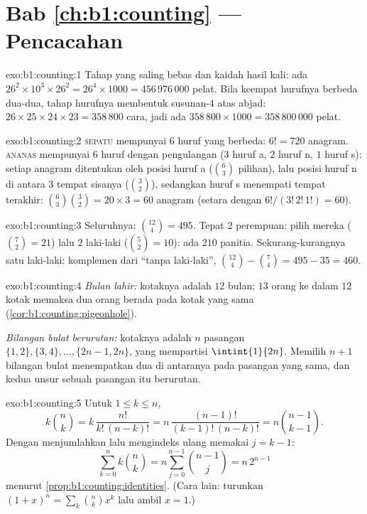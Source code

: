 \section*{Bab \ref{ch:b1:counting} --- Pencacahan}

\begin{solution}{exo:b1:counting:1}
Tahap yang saling bebas dan kaidah hasil kali: ada $26^2 \times 10^3 \times 26^2
= 26^4 \times 1000 = 456\,976\,000$ pelat. Bila keempat hurufnya
berbeda dua-dua, tahap hurufnya membentuk susunan-$4$ atas
abjad: $26 \times 25 \times 24 \times 23 = 358\,800$ cara, jadi ada
$358\,800 \times 1000 = 358\,800\,000$ pelat.
\end{solution}

\begin{solution}{exo:b1:counting:2}
\textsc{sepatu} mempunyai $6$ huruf yang berbeda: $6! = 720$ anagram.
\textsc{ananas} mempunyai $6$ huruf dengan pengulangan ($3$ huruf a, $2$ huruf n,
$1$ huruf s): setiap anagram ditentukan oleh posisi huruf a
($\binom 63$ pilihan), lalu posisi huruf n di antara $3$ tempat sisanya
($\binom 32$), sedangkan huruf s menempati tempat terakhir:
$\binom{6}{3}\binom{3}{2} = 20 \times 3 = 60$ anagram
(setara dengan $6!/(3!\,2!\,1!) = 60$).
\end{solution}

\begin{solution}{exo:b1:counting:3}
Seluruhnya: $\binom{12}{4} = 495$. Tepat $2$ perempuan: pilih mereka
($\binom 72 = 21$) lalu $2$ laki-laki ($\binom 52 = 10$): ada $210$ panitia.
Sekurang-kurangnya satu laki-laki: komplemen dari ``tanpa laki-laki'',
$\binom{12}{4} - \binom{7}{4} = 495 - 35 = 460$.
\end{solution}

\begin{solution}{exo:b1:counting:4}
\emph{Bulan lahir:} kotaknya adalah $12$ bulan; $13$ orang ke dalam $12$
kotak memaksa dua orang berada pada kotak yang sama
(\cref{cor:b1:counting:pigeonhole}).

\emph{Bilangan bulat berurutan:} kotaknya adalah $n$ pasangan $\{1,2\},
\{3,4\}, \dots, \{2n-1, 2n\}$, yang mempartisi $\intint{1}{2n}$.
Memilih $n + 1$ bilangan bulat menempatkan dua di antaranya pada pasangan yang sama, dan kedua
unsur sebuah pasangan itu berurutan.
\end{solution}

\begin{solution}{exo:b1:counting:5}
Untuk $1 \leq k \leq n$,
\[
k \binom nk = k\,\frac{n!}{k!\,(n-k)!}
= n\,\frac{(n-1)!}{(k-1)!\,(n-k)!} = n \binom{n-1}{k-1}.
\]
Dengan menjumlahkan lalu mengindeks ulang memakai $j = k - 1$:
\[
\sum_{k=0}^{n} k \binom nk = n \sum_{j=0}^{n-1} \binom{n-1}{j}
= n\, 2^{n-1}
\]
menurut \cref{prop:b1:counting:identities}. (Cara lain: turunkan
$(1+x)^n = \sum_k \binom nk x^k$ lalu ambil $x = 1$.)
\end{solution}

